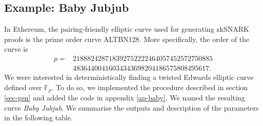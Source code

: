 \documentclass{article}
\newcommand{\Fp}{\ensuremath{\mathbb{F}_p}}
\theoremstyle{definition}
\theoremstyle{remark}
\begin{document}
\begin{spacing}{1.2}
\begin{multicols}{2}
\section{Example: Baby Jubjub}

In Ethereum, the pairing-friendly elliptic curve used for generating zkSNARK proofs is the prime order curve ALTBN128. More specifically, the order of the curve is 
%
	\begin{align*}
		p = & 218882428718392752222464057452572750885 \\
			& 48364400416034343698204186575808495617.
	\end{align*}	
%
We were interested in deterministically finding a twisted Edwards elliptic curve defined over $\Fp$. To do so, we implemented the procedure described in section \ref{sec-gen} and added the code in appendix \ref{ap-baby}. We named the resulting curve {\it Baby Jubjub}. We summarise the outputs and description of the parameters in the following table. 

		

\end{multicols}
\end{spacing}
\end{document}
